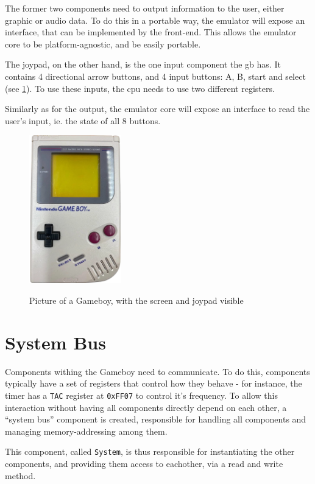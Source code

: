 \documentclass[11pt]{informatics-report}
\begin{document}
The former two components need to output information to the user, either graphic or audio data. To do this in a portable way, the emulator will expose an interface, that can be implemented by the front-end. This allows the emulator core to be platform-agnostic, and be easily portable.

The joypad, on the other hand, is the one input component the \gls{gb} has. It contains 4 directional arrow buttons, and 4 input buttons: A, B, start and select (see \ref{fig:gb-front}). To use these inputs, the \gls{cpu} needs to use two different registers.

Similarly as for the output, the emulator core will expose an interface to read  the user's input, ie. the state of all 8 buttons.

\begin{figure}[h]
    \centering
    \includegraphics[width=4cm]{images/gameboy}\\
    \caption{Picture of a Gameboy, with the screen and joypad visible}
    \label{fig:gb-front}
\end{figure}

\section{System Bus}

Components withing the Gameboy need to communicate. To do this, components typically have a set of registers that control how they behave - for instance, the timer has a \texttt{TAC} register at \texttt{0xFF07} to control it's frequency. To allow this interaction without having all components directly depend on each other, a ``system bus'' component is created, responsible for handling all components and managing memory-addressing among them.

This component, called \texttt{System}, is thus responsible for instantiating the other components, and providing them access to eachother, via a read and write method.
\end{document}
